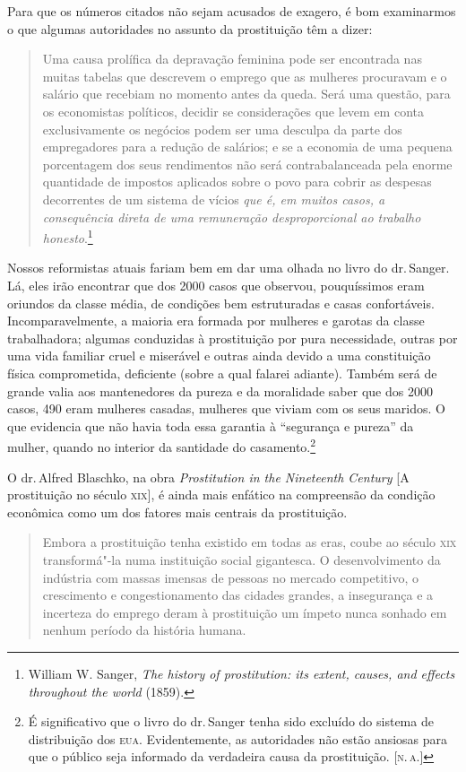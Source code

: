 Para que os números citados não sejam acusados de exagero, é bom
examinarmos o que algumas autoridades no assunto da prostituição têm a
dizer:

\begin{quote}
Uma causa prolífica da depravação feminina pode ser encontrada nas
muitas tabelas que descrevem o emprego que as mulheres procuravam e o
salário que recebiam no momento antes da queda. Será uma questão, para
os economistas políticos, decidir se considerações que levem em conta
exclusivamente os negócios podem ser uma desculpa da parte dos
empregadores para a redução de salários; e se a economia de uma pequena
porcentagem dos seus rendimentos não será contrabalanceada pela enorme
quantidade de impostos aplicados sobre o povo para cobrir as despesas
decorrentes de um sistema de vícios \emph{que é, em muitos casos, a
consequência direta de uma remuneração desproporcional ao trabalho
honesto}.\footnote{William W. Sanger, \emph{The history of
  prostitution: its extent, causes, and effects throughout the world}
  (1859).}
  \end{quote}

Nossos reformistas atuais fariam bem em dar uma olhada no livro do dr.\,Sanger. Lá, eles irão encontrar que dos 2000 casos que observou,
pouquíssimos eram oriundos da classe média, de condições bem
estruturadas e casas confortáveis. Incomparavelmente, a maioria era
formada por mulheres e garotas da classe trabalhadora; algumas
conduzidas à prostituição por pura necessidade, outras por uma vida
familiar cruel e miserável e outras ainda devido a uma constituição
física comprometida, deficiente (sobre a qual falarei adiante). Também
será de grande valia aos mantenedores da pureza e da moralidade saber
que dos 2000 casos, 490 eram mulheres casadas, mulheres que viviam com
os seus maridos. O que evidencia que não havia toda essa garantia à
``segurança e pureza'' da mulher, quando no interior da santidade do
casamento.\footnote{É significativo que o livro do dr.\,Sanger tenha sido
  excluído do sistema de distribuição dos \textsc{eua}. Evidentemente, as
  autoridades não estão ansiosas para que o público seja informado da
  verdadeira causa da prostituição. [\textsc{n.\,a.}]}

O dr.\,Alfred Blaschko, na obra \emph{Prostitution in the Nineteenth Century}
{[}A prostituição no século \textsc{xix}{]}, é ainda mais
enfático na compreensão da condição econômica como um dos fatores mais
centrais da prostituição.

\begin{quote}
Embora a prostituição tenha existido em todas as eras, coube ao século
\textsc{xix} transformá"-la numa instituição social gigantesca. O desenvolvimento
da indústria com massas imensas de pessoas no mercado competitivo, o
crescimento e congestionamento das cidades grandes, a insegurança e a
incerteza do emprego deram à prostituição um ímpeto nunca sonhado em
nenhum período da história humana.
\end{quote}

